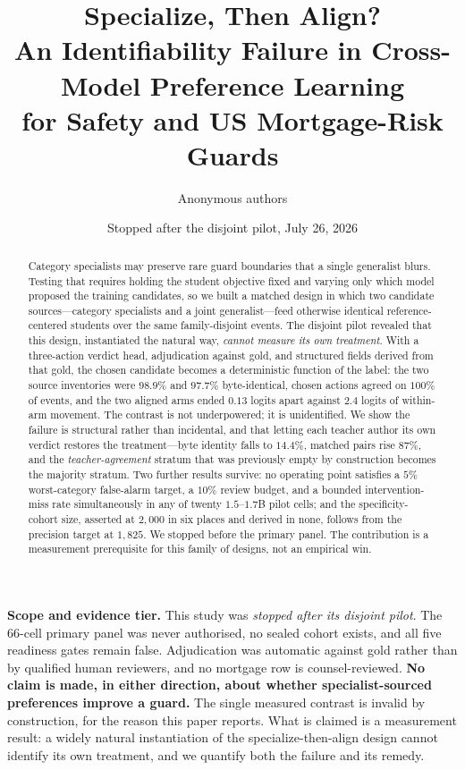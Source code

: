 \documentclass[10pt]{article}
\title{\textbf{Specialize, Then Align?}\\
An Identifiability Failure in Cross-Model Preference Learning\\
for Safety and US Mortgage-Risk Guards}
\author{Anonymous authors}
\date{Stopped after the disjoint pilot, July 26, 2026}
\begin{document}
\maketitle

\noindent\colorbox{softgray}{\parbox{0.965\linewidth}{
\textbf{Scope and evidence tier.} This study was \emph{stopped after its disjoint
pilot}. The 66-cell primary panel was never authorised, no sealed cohort exists, and
all five readiness gates remain false. Adjudication was automatic against gold rather
than by qualified human reviewers, and no mortgage row is counsel-reviewed. \textbf{No
claim is made, in either direction, about whether specialist-sourced preferences
improve a guard.} The single measured contrast is invalid by construction, for the
reason this paper reports. What is claimed is a measurement result: a widely natural
instantiation of the specialize-then-align design cannot identify its own treatment,
and we quantify both the failure and its remedy.
}}

\begin{abstract}
Category specialists may preserve rare guard boundaries that a single generalist
blurs. Testing that requires holding the student objective fixed and varying only
which model proposed the training candidates, so we built a matched design in which
two candidate sources---category specialists and a joint generalist---feed otherwise
identical reference-centered students over the same family-disjoint events. The
disjoint pilot revealed that this design, instantiated the natural way, \emph{cannot
measure its own treatment}. With a three-action verdict head, adjudication against
gold, and structured fields derived from that gold, the chosen candidate becomes a
deterministic function of the label: the two source inventories were $98.9\%$ and
$97.7\%$ byte-identical, chosen actions agreed on $100\%$ of events, and the two
aligned arms ended $0.13$ logits apart against $2.4$ logits of within-arm movement.
The contrast is not underpowered; it is unidentified. We show the failure is
structural rather than incidental, and that letting each teacher author its own
verdict restores the treatment---byte identity falls to $14.4\%$, matched pairs rise
$87\%$, and the \emph{teacher-agreement} stratum that was previously empty by
construction becomes the majority stratum. Two further results survive: no operating
point satisfies a $5\%$ worst-category false-alarm target, a $10\%$ review budget, and
a bounded intervention-miss rate simultaneously in any of twenty $1.5$--$1.7$B pilot
cells; and the specificity-cohort size, asserted at $2{,}000$ in six places and
derived in none, follows from the precision target at $1{,}825$. We stopped before the
primary panel. The contribution is a measurement prerequisite for this family of
designs, not an empirical win.
\end{abstract}
\end{document}
